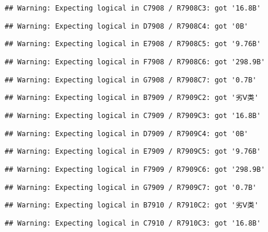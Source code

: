 \documentclass[
]{article}
\begin{document}
\begin{verbatim}
## Warning: Expecting logical in C7908 / R7908C3: got '16.8B'
\end{verbatim}

\begin{verbatim}
## Warning: Expecting logical in D7908 / R7908C4: got '0B'
\end{verbatim}

\begin{verbatim}
## Warning: Expecting logical in E7908 / R7908C5: got '9.76B'
\end{verbatim}

\begin{verbatim}
## Warning: Expecting logical in F7908 / R7908C6: got '298.9B'
\end{verbatim}

\begin{verbatim}
## Warning: Expecting logical in G7908 / R7908C7: got '0.7B'
\end{verbatim}

\begin{verbatim}
## Warning: Expecting logical in B7909 / R7909C2: got '劣Ⅴ类'
\end{verbatim}

\begin{verbatim}
## Warning: Expecting logical in C7909 / R7909C3: got '16.8B'
\end{verbatim}

\begin{verbatim}
## Warning: Expecting logical in D7909 / R7909C4: got '0B'
\end{verbatim}

\begin{verbatim}
## Warning: Expecting logical in E7909 / R7909C5: got '9.76B'
\end{verbatim}

\begin{verbatim}
## Warning: Expecting logical in F7909 / R7909C6: got '298.9B'
\end{verbatim}

\begin{verbatim}
## Warning: Expecting logical in G7909 / R7909C7: got '0.7B'
\end{verbatim}

\begin{verbatim}
## Warning: Expecting logical in B7910 / R7910C2: got '劣Ⅴ类'
\end{verbatim}

\begin{verbatim}
## Warning: Expecting logical in C7910 / R7910C3: got '16.8B'
\end{verbatim}
\end{document}
